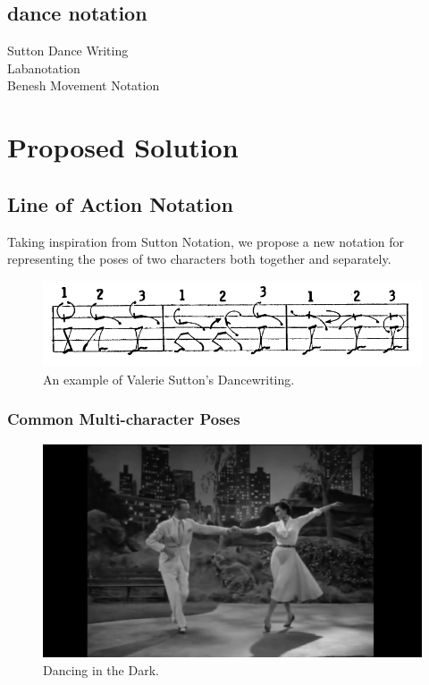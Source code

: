\documentclass[12pt, a4paper]{memoir}
\begin{document}
\subsection{dance notation}
Sutton Dance Writing\\
Labanotation\\
Benesh Movement Notation


\section{Proposed Solution}
\subsection{Line of Action Notation}
Taking inspiration from Sutton Notation, we propose a new notation for representing the poses of two characters both together and separately.

\begin{figure}[!h]
\centering
\includegraphics[scale=0.4]{img/sutton}
\caption{An example of Valerie Sutton's Dancewriting.}
\end{figure}

\subsubsection{Common Multi-character Poses}
\begin{figure}
\centering
\includegraphics[scale=0.1]{img/bandwagon}
\caption{Dancing in the Dark.}
\end{figure}
\end{document}

